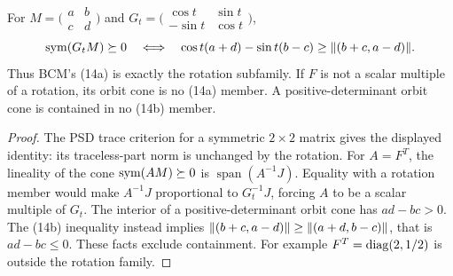 \begin{proposition}\label{fd:bcm}
For $M=\bigl(\begin{smallmatrix}a&b\\c&d\end{smallmatrix}\bigr)$ and
$G_t=\bigl(\begin{smallmatrix}\cos t&\sin t\\-\sin t&\cos t\end{smallmatrix}\bigr)$,
\[
 \operatorname{sym}(G_tM)\succeq0
 \quad\Longleftrightarrow\quad
 \cos t(a+d)-\sin t(b-c)\ge\lVert(b+c,a-d)\rVert.
\]
Thus BCM's (14a) is exactly the rotation subfamily.
If $F$ is not a scalar multiple of a rotation, its orbit cone
is no (14a) member. A positive-determinant orbit cone is
contained in no (14b) member.
\end{proposition}
\begin{proof}
The PSD trace criterion for a symmetric $2\times2$ matrix gives
the displayed identity: its traceless-part norm is unchanged
by the rotation. For $A=F^T$, the lineality of the cone
$\operatorname{sym}(AM)\succeq0$ is $\operatorname{span}(A^{-1}J)$.
Equality with a rotation member would make
$A^{-1}J$ proportional to $G_t^{-1}J$, forcing $A$ to be
a scalar multiple of $G_t$.
The interior of a positive-determinant orbit cone has
$ad-bc>0$. The (14b) inequality instead implies
$\lVert(b+c,a-d)\rVert\ge\lVert(a+d,b-c)\rVert$, that is $ad-bc\le0$.
These facts exclude containment. For example
$F^T=\operatorname{diag}(2,1/2)$ is outside the rotation family.
\end{proof}

